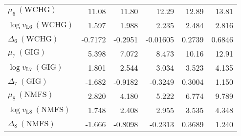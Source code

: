 \documentclass[11pt]{book}
\begin{document}
\begin{table}[ht]
\begin{tabular}{lrrrrr}
  $\mu_{6}~(\text{WCHG})$ & 11.08 & 11.80 & 12.29 & 12.89 & 13.81 \\ 
  $\log v_{\text{L}6}~(\text{WCHG})$ & 1.597 & 1.988 & 2.235 & 2.484 & 2.816 \\ 
  $\Delta_{6}~(\text{WCHG})$ & -0.7172 & -0.2951 & -0.01605 & 0.2739 & 0.6846 \\ 
  $\mu_{7}~(\text{GIG})$ & 5.398 & 7.072 & 8.473 & 10.16 & 12.91 \\ 
  $\log v_{\text{L}7}~(\text{GIG})$ & 1.801 & 2.544 & 3.034 & 3.523 & 4.135 \\ 
  $\Delta_{7}~(\text{GIG})$ & -1.682 & -0.9182 & -0.3249 & 0.3004 & 1.150 \\ 
  $\mu_{8}~(\text{NMFS})$ & 2.820 & 4.180 & 5.222 & 6.774 & 9.789 \\ 
  $\log v_{\text{L}8}~(\text{NMFS})$ & 1.748 & 2.408 & 2.955 & 3.535 & 4.348 \\ 
  $\Delta_{8}~(\text{NMFS})$ & -1.666 & -0.8098 & -0.2313 & 0.3689 & 1.240 \\ 
   \hline
\end{tabular}
\end{table}
\setlength{\tabcolsep}{6pt}
\end{document}
